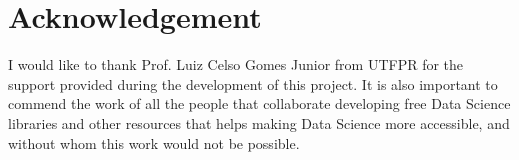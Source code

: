 \documentclass[conference]{IEEEtran}
\begin{document}
\section*{Acknowledgement}

I would like to thank Prof. Luiz Celso Gomes Junior from UTFPR for the support
provided during the development of this project. It is also important to commend
the work of all the people that collaborate developing free Data Science libraries
and other resources that helps making Data Science more accessible, and without
whom this work would not be possible.



\end{document}
